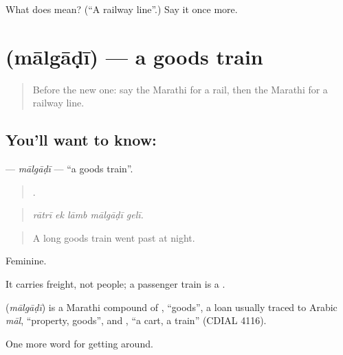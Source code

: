 \begin{tcolorbox}[breakable,colback=teal!4,colframe=teal!35!black,title={Before you move on}]
What does  mean? (\textquotedblleft{}A railway line\textquotedblright{}.) Say it once more.
\end{tcolorbox}
\section[\texorpdfstring{\mr{मालगाडी} (mālgāḍī)}{मालगाडी (mālgāḍī)}]{ (mālgāḍī) — a goods train}

\label{lesson:MR-C396-malgadi}



\begin{quote}
Before the new one: say the Marathi for a rail, then the Marathi for a railway line.
\end{quote}

\subsection*{You'll want to know: }
\textbf{} — \emph{mālgāḍī} — \textquotedblleft{}a goods train\textquotedblright{}.

\begin{quote}
    .
\end{quote}

\begin{quote}
\emph{rātrī ek lāmb mālgāḍī gelī.}
\end{quote}

\begin{quote}
A long goods train went past at night.
\end{quote}

Feminine.

It carries freight, not people; a passenger train is a  .

\begin{cousinweb}
\textbf{} (\emph{mālgāḍī}) is a Marathi compound of \textbf{}, \textquotedblleft{}goods\textquotedblright{}, a loan usually traced to Arabic \emph{māl}, \textquotedblleft{}property, goods\textquotedblright{}, and \textbf{}, \textquotedblleft{}a cart, a train\textquotedblright{} (CDIAL 4116).
\end{cousinweb}

\begin{grammarlens}[title={What you've built}]
One more word for getting around.
\end{grammarlens}

